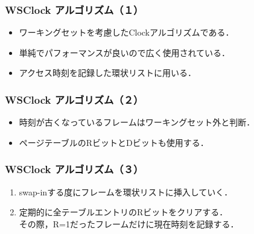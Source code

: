 \documentclass[unicode,handout]{beamer}                   %
\begin{document}
\begin{frame}
  \frametitle{WSClock アルゴリズム（１）}


  \begin{itemize}
  \item ワーキングセットを考慮したClockアルゴリズムである．
  \item 単純でパフォーマンスが良いので広く使用されている．
  \item アクセス時刻を記録した環状リストに用いる．
  \end{itemize}

\end{frame}

\begin{frame}
  \frametitle{WSClock アルゴリズム（２）}


  \begin{itemize}
  \item 時刻が古くなっているフレームはワーキングセット外と判断．
  \item ページテーブルのRビットとDビットも使用する．
  \end{itemize}
\end{frame}

\begin{frame}
  \frametitle{WSClock アルゴリズム（３）}


  \begin{enumerate}
  \item[1.] swap-inする度にフレームを環状リストに挿入していく．
  \item[2.] 定期的に全テーブルエントリのRビットをクリアする．\\
    その際，R=1だったフレームだけに現在時刻を記録する．
  \end{enumerate}
\end{frame}
\end{document}
